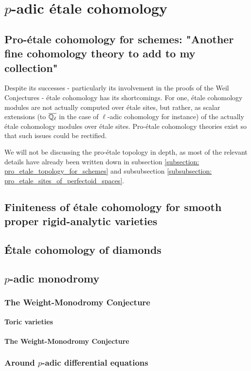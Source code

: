 \chapter{\texorpdfstring{$p$}{}-adic \'etale cohomology}
    \begin{abstract}
        
    \end{abstract}
    
    \minitoc
    
    \section{Pro-\'etale cohomology for schemes: "Another fine cohomology theory to add to my collection"}
        Despite its successes - particularly its involvement in the proofs of the Weil Conjectures - \'etale cohomology has its shortcomings. For one, \'etale cohomology modules are not actually computed over \'etale sites, but rather, as scalar extensions (to $\overline{\mathbb{Q}_{\ell}}$ in the case of $\ell$-adic cohomology for instance) of the actually \'etale cohomology modules over \'etale sites. Pro-\'etale cohomology theories exist so that such issues could be rectified. 
        
        \begin{remark}
            We will not be discussing the pro-\'etale topology in depth, as most of the relevant details have already been written down in subsection \ref{subsection: pro_etale_topology_for_schemes} and subsubsection \ref{subsubsection: pro_etale_sites_of_perfectoid_spaces}.
        \end{remark}
        
    \section{Finiteness of \'etale cohomology for smooth proper rigid-analytic varieties}
    
    \section{\'Etale cohomology of diamonds}
        
    \section{\texorpdfstring{$p$}{}-adic monodromy}
        \subsection{The Weight-Monodromy Conjecture}
            \subsubsection{Toric varieties}
            
            \subsubsection{The Weight-Monodromy Conjecture}
            
        \subsection{Around \texorpdfstring{$p$}{}-adic differential equations}